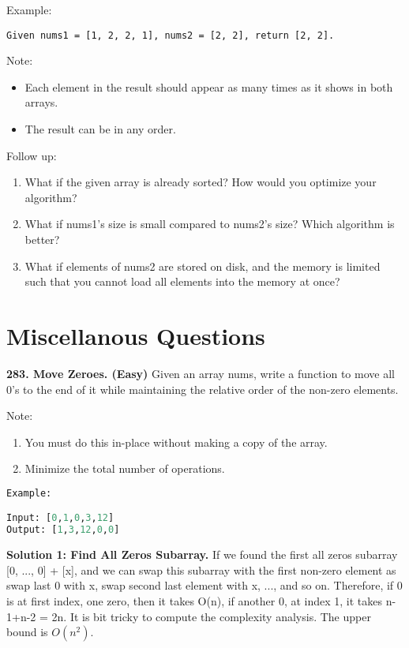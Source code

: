 \documentclass[../main.tex]{subfiles}
\begin{document}
\begin{enumerate}
Example:
\begin{lstlisting}
Given nums1 = [1, 2, 2, 1], nums2 = [2, 2], return [2, 2].
\end{lstlisting}

Note:
\begin{itemize}
    \item Each element in the result should appear as many times as it shows in both arrays.
    \item The result can be in any order.
\end{itemize}

Follow up:
\begin{enumerate}
    \item  What if the given array is already sorted? How would you optimize your algorithm?
    \item What if nums1's size is small compared to nums2's size? Which algorithm is better?
    \item What if elements of nums2 are stored on disk, and the memory is limited such that you cannot load all elements into the memory at once?
\end{enumerate}

\end{enumerate}

\section{Miscellanous Questions}
\begin{examples}[resume]
\item \textbf{283. Move Zeroes. (Easy)} 
Given an array nums, write a function to move all 0's to the end of it while maintaining the relative order of the non-zero elements.

Note:
\begin{enumerate}
    \item You must do this in-place without making a copy of the array.
    \item Minimize the total number of operations.
\end{enumerate}
\begin{lstlisting}[language=Python]
Example:

Input: [0,1,0,3,12]
Output: [1,3,12,0,0]
\end{lstlisting}
\textbf{Solution 1: Find All Zeros Subarray.} If we found the first all zeros subarray [0, ..., 0] + [x], and we can swap this subarray with the first non-zero element as swap last 0 with x, swap second last element with x, ..., and so on. Therefore, if 0 is at first index, one zero, then it takes O(n), if another 0, at index 1, it takes n-1+n-2 = 2n. It is bit tricky to compute the complexity analysis. The upper bound is $O(n^2)$. 
\end{examples}
\end{document}
